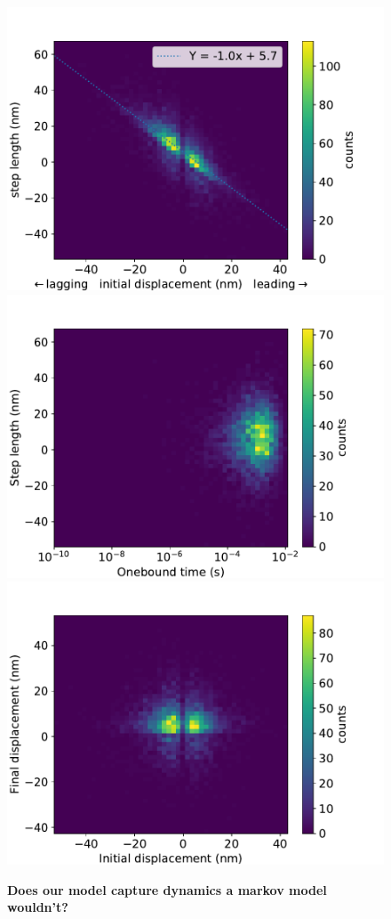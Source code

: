 \documentclass[9pt,twocolumn,twoside]{pnas-new}
\begin{document}
\begin{figure}[tbhp]
  \centering
  \includegraphics[width=\linewidth]{../../plots/paper_displacement_vs_step_length.pdf}
  \includegraphics[width=\linewidth]{../../plots/paper_onebound_vs_steplength.pdf}
  \includegraphics[width=\linewidth]{../../plots/paper_initial_vs_final_displacement.pdf}
\caption{\textbf{Does our model capture dynamics a markov model wouldn't?}}
\label{fig:}
\end{figure}
\end{document}

